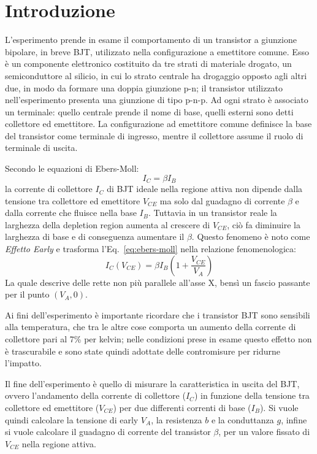 \documentclass[../main.tex]{subfiles}
\begin{document}
    \section{Introduzione} \label{sec:introduzione}

    L'esperimento prende in esame il comportamento di un transistor a giunzione bipolare,
    in breve BJT, utilizzato nella configurazione a emettitore comune.
    Esso è un componente elettronico costituito da tre strati di materiale drogato,
    un semiconduttore al silicio, in cui lo strato centrale ha drogaggio opposto agli
    altri due, in modo da formare una doppia giunzione p-n; il transistor
    utilizzato nell'esperimento presenta una giunzione di tipo p-n-p.
    Ad ogni strato è associato un terminale: quello centrale prende il nome di base,
    quelli esterni sono detti collettore ed emettitore.
    La configurazione ad emettitore comune definisce la base del transistor come
    terminale di ingresso, mentre il collettore assume il ruolo di terminale di uscita.

    Secondo le equazioni di Ebers-Moll:
    \begin{equation}
        I_C = \beta I_B
        \label{eq:ebers-moll}
    \end{equation}
    la corrente di collettore $I_C$ di BJT ideale nella regione
    attiva non dipende dalla tensione tra collettore ed
    emettitore $V_{CE}$ ma solo dal guadagno di corrente $\beta$ e
    dalla corrente che fluisce nella base $I_B$.
    Tuttavia in un transistor reale la larghezza della depletion
    region aumenta al crescere di $V_{CE}$, ciò fa diminuire la
    larghezza di base e di conseguenza aumentare il $\beta$.
    Questo fenomeno è noto come \textit{Effetto Early} e trasforma
    l'Eq.~\eqref{eq:ebers-moll} nella relazione fenomenologica:
    \begin{equation}
        I_C(V_{CE}) = \beta I_B \left( 1 + \frac{V_{CE}}{V_A} \right)
        \label{eq:early}
    \end{equation}
    La quale descrive delle rette non più parallele all'asse X,
    bensì un fascio passante per il punto $(V_A, 0)$.

    Ai fini dell'esperimento è importante ricordare che i transistor BJT sono sensibili
    alla temperatura, che tra le altre cose comporta un aumento della
    corrente di collettore pari al 7\% per kelvin; nelle condizioni prese in esame
    questo effetto non è trascurabile e sono state quindi adottate delle contromisure per
    ridurne l'impatto.

    Il fine dell'esperimento è quello di misurare la caratteristica in uscita del BJT,
    ovvero l'andamento della corrente di collettore ($I_C$) in funzione della tensione
    tra collettore ed emettitore ($V_{CE}$) per due differenti correnti di base ($I_B$).
    Si vuole quindi calcolare la tensione di early $V_A$, la resistenza $b$ e la
    conduttanza $g$, infine si vuole calcolare il guadagno di corrente del transistor
    $\beta$, per un valore fissato di $V_{CE}$ nella regione attiva.

\end{document}
